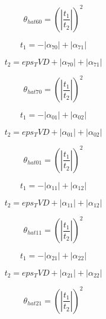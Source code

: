 \documentclass{article}
\begin{document}
\begin{dmath}\theta_{hat 60} = \left(\left|{\frac{t_{1}}{t_{2}}}\right| \right)^{2}\end{dmath}

\begin{dmath}t_{1} = - \left|{\alpha_{70}}\right| + \left|{\alpha_{71}}\right|\end{dmath}

\begin{dmath}t_{2} = eps_TVD + \left|{\alpha_{70}}\right| + \left|{\alpha_{71}}\right|\end{dmath}

\begin{dmath}\theta_{hat 70} = \left(\left|{\frac{t_{1}}{t_{2}}}\right| \right)^{2}\end{dmath}

\begin{dmath}t_{1} = - \left|{\alpha_{01}}\right| + \left|{\alpha_{02}}\right|\end{dmath}

\begin{dmath}t_{2} = eps_TVD + \left|{\alpha_{01}}\right| + \left|{\alpha_{02}}\right|\end{dmath}

\begin{dmath}\theta_{hat 01} = \left(\left|{\frac{t_{1}}{t_{2}}}\right| \right)^{2}\end{dmath}

\begin{dmath}t_{1} = - \left|{\alpha_{11}}\right| + \left|{\alpha_{12}}\right|\end{dmath}

\begin{dmath}t_{2} = eps_TVD + \left|{\alpha_{11}}\right| + \left|{\alpha_{12}}\right|\end{dmath}

\begin{dmath}\theta_{hat 11} = \left(\left|{\frac{t_{1}}{t_{2}}}\right| \right)^{2}\end{dmath}

\begin{dmath}t_{1} = - \left|{\alpha_{21}}\right| + \left|{\alpha_{22}}\right|\end{dmath}

\begin{dmath}t_{2} = eps_TVD + \left|{\alpha_{21}}\right| + \left|{\alpha_{22}}\right|\end{dmath}

\begin{dmath}\theta_{hat 21} = \left(\left|{\frac{t_{1}}{t_{2}}}\right| \right)^{2}\end{dmath}
\end{document}
